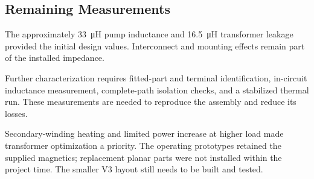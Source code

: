 \subsection{Remaining Measurements}
\label{sec:mag-limitations}

The approximately \SI{33}{\micro\henry} pump inductance and \SI{16.5}{\micro\henry} transformer leakage provided the initial design values. Interconnect and mounting effects remain part of the installed impedance.

Further characterization requires fitted-part and terminal identification, in-circuit inductance measurement, complete-path isolation checks, and a stabilized thermal run. These measurements are needed to reproduce the assembly and reduce its losses.

Secondary-winding heating and limited power increase at higher load made transformer optimization a priority. The operating prototypes retained the supplied magnetics; replacement planar parts were not installed within the project time. The smaller V3 layout still needs to be built and tested.
